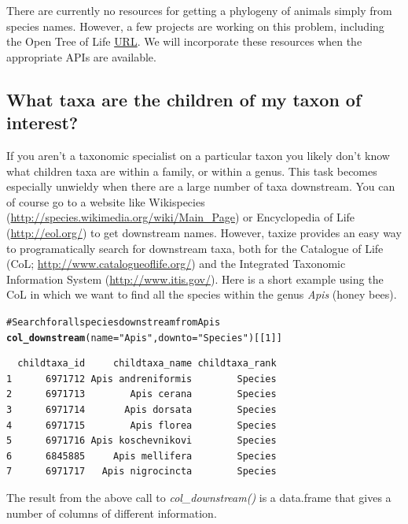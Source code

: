 \documentclass[letterpaper,superscriptaddress,showkeys,longbibliography,10pt]{revtex4-1}\usepackage{graphicx, color}
\makeatletter
\newcommand{\hlfunctioncall}[1]{\textcolor[rgb]{0.501960784313725,0,0.329411764705882}{\textbf{#1}}}%
\newcommand{\hlstring}[1]{\textcolor[rgb]{0.6,0.6,1}{#1}}%
\newcommand{\hlcomment}[1]{\textcolor[rgb]{0.180392156862745,0.6,0.341176470588235}{#1}}%
\newenvironment{kframe}{%
 \def\at@end@of@kframe{}%
 \ifinner\ifhmode%
  \def\at@end@of@kframe{\end{minipage}}%
  \begin{minipage}{\columnwidth}%
 \fi\fi%
 \def\FrameCommand##1{\hskip\@totalleftmargin \hskip-\fboxsep
 \colorbox{shadecolor}{##1}\hskip-\fboxsep
     \hskip-\linewidth \hskip-\@totalleftmargin \hskip\columnwidth}%
 \MakeFramed {\advance\hsize-\width
   \@totalleftmargin\z@ \linewidth\hsize
   \@setminipage}}%
 {\par\unskip\endMakeFramed%
 \at@end@of@kframe}
\newenvironment{knitrout}{}{} %
\makeatother
\begin{document}
There are currently no resources for getting a phylogeny of animals simply from species names. However, a few projects are working on this problem, including the Open Tree of Life \url{URL}. We will incorporate these resources when the appropriate APIs are available.

\subsection{What taxa are the children of my taxon of interest?}

If you aren't a taxonomic specialist on a particular taxon you likely don't know what children taxa are within a family, or within a genus. This task becomes especially unwieldy when there are a large number of taxa downstream. You can of course go to a website like Wikispecies (\url{http://species.wikimedia.org/wiki/Main_Page}) or Encyclopedia of Life (\url{http://eol.org/}) to get downstream names. However, taxize provides an easy way to programatically search for downstream taxa, both for the Catalogue of Life (CoL; \url{http://www.catalogueoflife.org/}) and the Integrated Taxonomic Information System (\url{http://www.itis.gov/}). Here is a short example using the CoL in which we want to find all the species within the genus \emph{Apis} (honey bees).

\begin{knitrout}
\color{fgcolor}\begin{kframe}
\begin{alltt}
\hlcomment{# Search for all species downstream from Apis}
\hlfunctioncall{col_downstream}(name = \hlstring{"Apis"}, downto = \hlstring{"Species"})[[1]]
\end{alltt}
\begin{verbatim}
  childtaxa_id     childtaxa_name childtaxa_rank
1      6971712 Apis andreniformis        Species
2      6971713        Apis cerana        Species
3      6971714       Apis dorsata        Species
4      6971715        Apis florea        Species
5      6971716 Apis koschevnikovi        Species
6      6845885     Apis mellifera        Species
7      6971717   Apis nigrocincta        Species
\end{verbatim}
\end{kframe}
\end{knitrout}


The result from the above call to \emph{col\_downstream()} is a data.frame that gives a number of columns of different information. 
\end{document}
